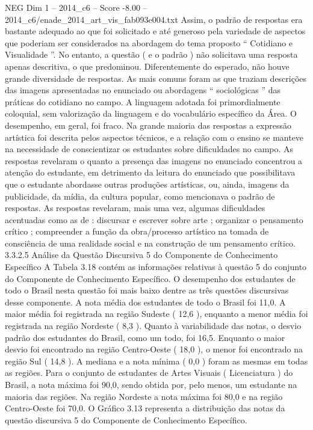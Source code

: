 \begin{textsample}{NEG Dim 1 – 2014\_c6 – Score -8.00 – 2014\_c6/enade\_2014\_art\_vis\_fab093e004.txt}
Assim, o padrão de respostas era bastante adequado ao que foi solicitado e até generoso pela variedade de aspectos que poderiam ser considerados na abordagem do tema proposto “ Cotidiano e Visualidade ”.
No entanto, a questão ( e o padrão ) não solicitava uma resposta apenas descritiva, o que predominou.
Diferentemente do esperado, não houve grande diversidade de respostas.
As mais comuns foram as que traziam descrições das imagens apresentadas no enunciado ou abordagens “ sociológicas ” das práticas do cotidiano no campo.
A linguagem adotada foi primordialmente coloquial, sem valorização da linguagem e do vocabulário específico da Área.
O desempenho, em geral, foi fraco.
Na grande maioria das respostas a expressão artística foi descrita pelos aspectos técnicos, e a relação com o ensino se manteve na necessidade de conscientizar os estudantes sobre dificuldades no campo.
As respostas revelaram o quanto a presença das imagens no enunciado concentrou a atenção do estudante, em detrimento da leitura do enunciado que possibilitava que o estudante abordasse outras produções artísticas, ou, ainda, imagens da publicidade, da mídia, da cultura popular, como mencionava o padrão de respostas.
As respostas revelaram, mais uma vez, algumas dificuldades acentuadas como as de : discursar e escrever sobre arte ; organizar o pensamento crítico ; compreender a função da obra/processo artístico na tomada de consciência de uma realidade social e na construção de um pensamento crítico. 3.3.2.5 Análise da Questão Discursiva 5 do Componente de Conhecimento Específico A Tabela 3.18 contém as informações relativas à questão 5 do conjunto do Componente de Conhecimento Específico.
O desempenho dos estudantes de todo o Brasil nesta questão foi mais baixo dentre as três questões discursivas desse componente.
A nota média dos estudantes de todo o Brasil foi 11,0.
A maior média foi registrada na região Sudeste ( 12,6 ), enquanto a menor média foi registrada na região Nordeste ( 8,3 ).
Quanto à variabilidade das notas, o desvio padrão dos estudantes do Brasil, como um todo, foi 16,5.
Enquanto o maior desvio foi encontrado na região Centro-Oeste ( 18,0 ), o menor foi encontrado na região Sul ( 14,8 ).
A mediana e a nota mínima ( 0,0 ) foram as mesmas em todas as regiões.
Para o conjunto de estudantes de Artes Visuais ( Licenciatura ) do Brasil, a nota máxima foi 90,0, sendo obtida por, pelo menos, um estudante na maioria das regiões.
Na região Nordeste a nota máxima foi 80,0 e na região Centro-Oeste foi 70,0.
O Gráfico 3.13 representa a distribuição das notas da questão discursiva 5 do Componente de Conhecimento Específico.

\end{textsample}
